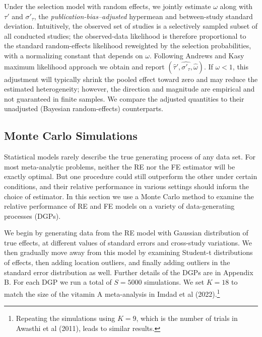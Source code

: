 \documentclass[12pt]{article}
\begin{document}
Under the selection model with random effects, we jointly estimate \(\omega\) along with \(\tau'\) and \(\sigma'_{\tau}\), the \emph{publication-bias–adjusted} hypermean and between-study standard deviation. Intuitively, the observed set of studies is a selectively sampled subset of all conducted studies; the observed-data likelihood is therefore proportional to the standard random-effects likelihood reweighted by the selection probabilities, with a normalizing constant that depends on \(\omega\). Following Andrews and Kasy maximum likelihood approach we obtain and report \((\hat\tau', \widehat{\sigma'_{\tau}}, \hat\omega)\). If $\omega < 1$, this adjustment will typically shrink the pooled effect toward zero and may reduce the estimated heterogeneity; however, the direction and magnitude are empirical and not guaranteed in finite samples. We compare the adjusted quantities to their unadjusted (Bayesian random-effects) counterparts.



\subsection{Monte Carlo Simulations} \label{section:simulations}

Statistical models rarely describe the true generating process of any data set. For most meta-analytic problems, neither the RE nor the FE estimator will be exactly optimal. But one procedure could still outperform the other under certain conditions, and their relative performance in various settings should inform the choice of estimator. In this section we use a Monte Carlo method to examine the relative performance of RE and FE models on a variety of data-generating processes (DGPs).

We begin by generating data from the RE model with Gaussian distribution of true effects, at different values of standard errors and cross-study variations. We then gradually move away from this model by examining Student-t distributions of effects, then adding location outliers, and finally adding outliers in the standard error distribution as well. Further details of the DGPs are in Appendix B. For each DGP we run a total of $S = 5000$ simulations. We set $K=18$ to match the size of the vitamin A meta-analysis in Imdad et al (2022).\footnote{Repeating the simulations using $K=9$, which is the number of trials in Awasthi et al (2011), leads to similar results.}
\end{document}
